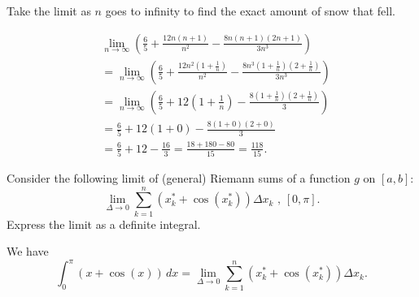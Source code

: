 \documentclass[handout, nooutcomes]{ximera}
\renewenvironment{freeResponse}{
\ifhandout\setbox0\vbox\bgroup\else
\begin{trivlist}\item[\hskip \labelsep\bfseries Solution:\hspace{2ex}]
\fi}
{\ifhandout\egroup\else
\end{trivlist}
\fi}
\renewcommand{\d}{\,d}
\begin{document}
\begin{problem}
\begin{enumerate}
		
		
	\item  Take the limit as $n$ goes to infinity to find the exact amount of snow that fell.
		\begin{freeResponse}
			\begin{align*}
			&  \lim_{n \to \infty} \left( \frac{6}{5} + \frac{12n(n+1)}{n^2} - \frac{8n(n+1)(2n+1)}{3n^3} \right)  \\
			&= \lim_{n \to \infty} \left( \frac{6}{5} + \frac{12n^2(1+\frac{1}{n})}{n^2} - \frac{8n^3(1+\frac{1}{n})(2+\frac{1}{n})}{3n^3} \right)  \\
			&= \lim_{n \to \infty} \left( \frac{6}{5} + 12 \left( 1 + \frac{1}{n} \right) - \frac{8(1 + \frac{1}{n})(2 + \frac{1}{n})}{3} \right)  \\
			&= \frac{6}{5} + 12(1 + 0) - \frac{8(1+0)(2+0)}{3}  \\
			&= \frac{6}{5} + 12 - \frac{16}{3} = \frac{18 + 180 - 80}{15} = \frac{118}{15}.
			\end{align*}
		\end{freeResponse}
		
		
		
	\end{enumerate}
\end{problem}
\begin{problem}
  Consider the following limit of (general) Riemann sums of a function $g$ on $[a, b]$:
  \[
    \lim_{\Delta \to 0} \sum_{k = 1}^n (x_k^* + \cos(x_k^*)) \Delta x_k\mbox{ , $[0, \pi]$.}
  \]
  Express the limit as a definite integral.
  \begin{freeResponse}
    We have 
    \[
      \int_0^\pi(x + \cos(x))\d x = \lim_{\Delta \to 0} \sum_{k = 1}^n (x_k^* + \cos(x_k^*)) \Delta x_k.
    \]
  \end{freeResponse}
\end{problem}
\end{document}
